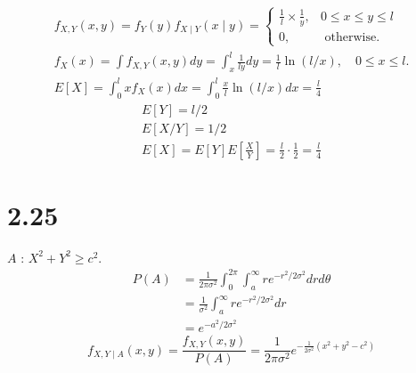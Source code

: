 \documentclass{article}
\begin{document}
		$$
		\begin{gathered}
		f_{X, Y}(x, y)=f_{Y}(y) f_{X \mid Y}(x \mid y)= \begin{cases}\frac{1}{l} \times \frac{1}{y}, & 0 \leq x \leq y \leq l \\
		0, & \text { otherwise. }\end{cases} \\
		f_{X}(x)=\int f_{X, Y}(x, y) d y=\int_{x}^{l} \frac{1}{l y} d y=\frac{1}{l} \ln (l / x), \quad 0 \leq x \leq l . \\
		E[X]=\int_{0}^{l} x f_{X}(x) d x=\int_{0}^{l} \frac{x}{l} \ln (l / x) d x=\frac{l}{4}
		\end{gathered}
		$$
		$$
		\begin{gathered}
		E[Y]=l / 2 \\
		E[X / Y]=1 / 2 \\
		E[X]=E[Y] E\left[\frac{X}{Y}\right]=\frac{l}{2} \cdot \frac{1}{2}=\frac{l}{4}
		\end{gathered}
		$$

			
		
	\section*{2.25}
	
		$A$ : $X^{2}+Y^{2} \geq c^{2}$.
		$$
		\begin{aligned}
		P(A) &=\frac{1}{2 \pi \sigma^{2}} \int_{0}^{2 \pi} \int_{a}^{\infty} r e^{-r^{2} / 2 \sigma^{2}} d r d \theta \\
		&=\frac{1}{\sigma^{2}} \int_{a}^{\infty} r e^{-r^{2} / 2 \sigma^{2}} d r \\
		&=e^{-a^{2} / 2 \sigma^{2}}
		\end{aligned}
		$$
		$$
		f_{X, Y \mid A}(x, y)=\frac{f_{X, Y}(x, y)}{P(A)}=\frac{1}{2 \pi \sigma^{2}} e^{-\frac{1}{2 \sigma^{2}}\left(x^{2}+y^{2}-c^{2}\right)}
		$$
\end{document}
